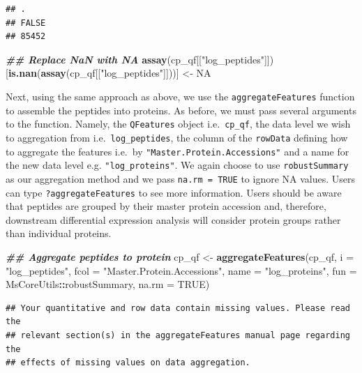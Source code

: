 \documentclass[9pt,a4paper,]{extarticle}
\newenvironment{Shaded}{\begin{snugshade}}{\end{snugshade}}
\newcommand{\AttributeTok}[1]{\textcolor[rgb]{0.13,0.29,0.53}{#1}}
\newcommand{\ConstantTok}[1]{\textcolor[rgb]{0.56,0.35,0.01}{#1}}
\newcommand{\DocumentationTok}[1]{\textcolor[rgb]{0.56,0.35,0.01}{\textbf{\textit{#1}}}}
\newcommand{\FunctionTok}[1]{\textcolor[rgb]{0.13,0.29,0.53}{\textbf{#1}}}
\newcommand{\NormalTok}[1]{#1}
\newcommand{\OtherTok}[1]{\textcolor[rgb]{0.56,0.35,0.01}{#1}}
\newcommand{\SpecialCharTok}[1]{\textcolor[rgb]{0.81,0.36,0.00}{\textbf{#1}}}
\newcommand{\StringTok}[1]{\textcolor[rgb]{0.31,0.60,0.02}{#1}}
\begin{document}
\begin{verbatim}
## .
## FALSE 
## 85452
\end{verbatim}

\begin{Shaded}
\begin{Highlighting}[]
\DocumentationTok{\#\# Replace NaN with NA}
\FunctionTok{assay}\NormalTok{(cp\_qf[[}\StringTok{"log\_peptides"}\NormalTok{]])[}\FunctionTok{is.nan}\NormalTok{(}\FunctionTok{assay}\NormalTok{(cp\_qf[[}\StringTok{"log\_peptides"}\NormalTok{]]))] }\OtherTok{\textless{}{-}} \ConstantTok{NA}
\end{Highlighting}
\end{Shaded}

Next, using the same approach as above, we use the \texttt{aggregateFeatures} function
to assemble the peptides into proteins. As before, we must pass several
arguments to the function. Namely, the \texttt{QFeatures} object i.e.~\texttt{cp\_qf}, the data
level we wish to aggregation from i.e.~\texttt{log\_peptides}, the column of the
\texttt{rowData} defining how to aggregate the features i.e.~by
\texttt{"Master.Protein.Accessions"} and a name for the new data level e.g.
\texttt{"log\_proteins"}. We again choose to use \texttt{robustSummary} as our aggregation
method and we pass \texttt{na.rm\ =\ TRUE} to ignore NA values. Users can type
\texttt{?aggregateFeatures} to see more information. Users should be aware that
peptides are grouped by their master protein accession and, therefore,
downstream differential expression analysis will consider protein groups rather
than individual proteins.

\begin{Shaded}
\begin{Highlighting}[]
\DocumentationTok{\#\# Aggregate peptides to protein}
\NormalTok{cp\_qf }\OtherTok{\textless{}{-}} \FunctionTok{aggregateFeatures}\NormalTok{(cp\_qf,}
                           \AttributeTok{i =} \StringTok{"log\_peptides"}\NormalTok{,}
                           \AttributeTok{fcol =} \StringTok{"Master.Protein.Accessions"}\NormalTok{,}
                           \AttributeTok{name =} \StringTok{"log\_proteins"}\NormalTok{,}
                           \AttributeTok{fun =}\NormalTok{ MsCoreUtils}\SpecialCharTok{::}\NormalTok{robustSummary,}
                           \AttributeTok{na.rm =} \ConstantTok{TRUE}\NormalTok{)}
\end{Highlighting}
\end{Shaded}

\begin{verbatim}
## Your quantitative and row data contain missing values. Please read the
## relevant section(s) in the aggregateFeatures manual page regarding the
## effects of missing values on data aggregation.
\end{verbatim}
\end{document}

